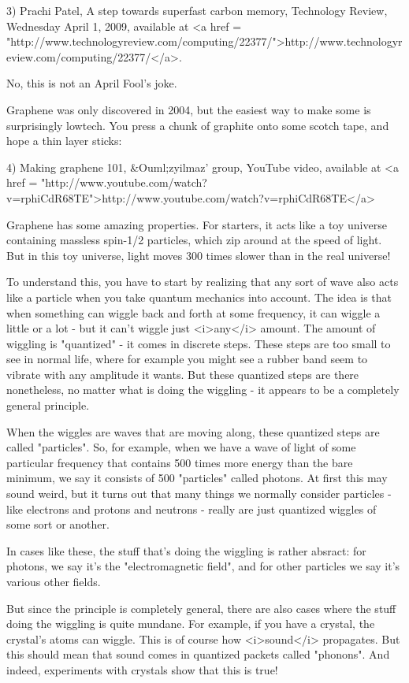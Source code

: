 3) Prachi Patel, A step towards superfast carbon memory, 
Technology Review, Wednesday April 1, 2009, available at  
<a href = "http://www.technologyreview.com/computing/22377/">http://www.technologyreview.com/computing/22377/</a>.

No, this is not an April Fool's joke.

Graphene was only discovered in 2004, but the easiest way to 
make some is surprisingly lowtech.  You press a chunk of 
graphite onto some scotch tape, and hope a thin layer sticks:

4) Making graphene 101, &Ouml;zyilmaz' group, YouTube video, 
available at <a href = "http://www.youtube.com/watch?v=rphiCdR68TE">http://www.youtube.com/watch?v=rphiCdR68TE</a>

Graphene has some amazing properties.  For starters, it acts 
like a toy universe containing massless spin-1/2 particles, 
which zip around at the speed of light.  But in this toy
universe, light moves 300 times slower than in the real universe!

To understand this, you have to start by realizing that any sort of
wave also acts like a particle when you take quantum mechanics into
account.  The idea is that when something can wiggle back and forth at
some frequency, it can wiggle a little or a lot - but it can't wiggle
just <i>any</i> amount.  The amount of wiggling is
"quantized" - it comes in discrete steps.  These steps are
too small to see in normal life, where for example you might see a
rubber band seem to vibrate with any amplitude it wants.  But these
quantized steps are there nonetheless, no matter what is doing the
wiggling - it appears to be a completely general principle.

When the wiggles are waves that are moving along, these quantized
steps are called "particles".  So, for example, when we have
a wave of light of some particular frequency that contains 500 times
more energy than the bare minimum, we say it consists of 500
"particles" called photons.  At first this may sound weird,
but it turns out that many things we normally consider particles -
like electrons and protons and neutrons - really are just quantized
wiggles of some sort or another.

In cases like these, the stuff that's doing the wiggling is rather
absract: for photons, we say it's the "electromagnetic
field", and for other particles we say it's various other fields.

But since the principle is completely general, there are also cases
where the stuff doing the wiggling is quite mundane.  For example, if
you have a crystal, the crystal's atoms can wiggle.  This is of course
how <i>sound</i> propagates.  But this should mean that sound comes in
quantized packets called "phonons".  And indeed, experiments
with crystals show that this is true!

